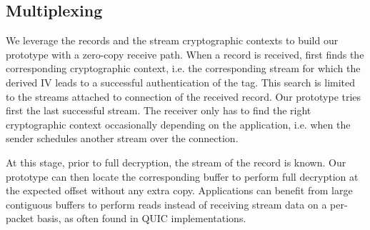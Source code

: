 \subsection{Multiplexing}
\label{sec:prot-multiplexing}

We leverage the \tcpls records and the \tcpls stream cryptographic contexts to
build our prototype with a zero-copy receive path. When a record is received,
\tcpls first finds the corresponding cryptographic context, i.e. the
corresponding \tcpls stream for which the derived IV leads to a successful
authentication of the tag. This search is limited to the streams attached to
\tcp connection of the received record. Our prototype tries first the last
successful \tcpls stream. The receiver only has to find the right cryptographic
context occasionally depending on the application, i.e. when the sender
schedules another stream over the \tcp connection.

At this stage, prior to full decryption, the
\tcpls stream of the record is known. Our prototype can then locate the
corresponding buffer
to perform full decryption at the expected offset without any extra copy.
Applications can benefit from large contiguous
buffers to perform reads instead of receiving stream data on a per-packet basis,
as often found in QUIC implementations.



